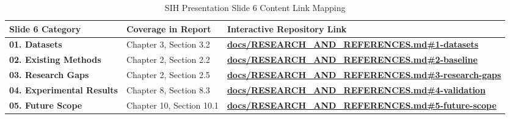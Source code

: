 \documentclass[11pt,a4paper,oneside]{report}
\begin{document}
\begin{table}[htbp]
\centering
\small
\caption{SIH Presentation Slide 6 Content Link Mapping}
\label{tab:sih_links}
\begin{tabularx}{\textwidth}{l p{4.5cm} X}
\toprule
\textbf{Slide 6 Category} & \textbf{Coverage in Report} & \textbf{Interactive Repository Link} \\
\midrule
\textbf{01. Datasets} & Chapter 3, Section 3.2 & \href{https://github.com/AstroNewz/Downscaling-of-weather-forecast-from-Block-level-to-Panchayat-level/blob/main/docs/RESEARCH_AND_REFERENCES.md\#1-datasets--data-sources}{\textbf{docs/RESEARCH\_AND\_REFERENCES.md\#1-datasets}} \\
\textbf{02. Existing Methods} & Chapter 2, Section 2.2 & \href{https://github.com/AstroNewz/Downscaling-of-weather-forecast-from-Block-level-to-Panchayat-level/blob/main/docs/RESEARCH_AND_REFERENCES.md\#2-baseline--existing-methods}{\textbf{docs/RESEARCH\_AND\_REFERENCES.md\#2-baseline}} \\
\textbf{03. Research Gaps} & Chapter 2, Section 2.5 & \href{https://github.com/AstroNewz/Downscaling-of-weather-forecast-from-Block-level-to-Panchayat-level/blob/main/docs/RESEARCH_AND_REFERENCES.md\#3-research-challenges--gaps}{\textbf{docs/RESEARCH\_AND\_REFERENCES.md\#3-research-gaps}} \\
\textbf{04. Experimental Results} & Chapter 8, Section 8.3 & \href{https://github.com/AstroNewz/Downscaling-of-weather-forecast-from-Block-level-to-Panchayat-level/blob/main/docs/RESEARCH_AND_REFERENCES.md\#4-experimental-results--validation}{\textbf{docs/RESEARCH\_AND\_REFERENCES.md\#4-validation}} \\
\textbf{05. Future Scope} & Chapter 10, Section 10.1 & \href{https://github.com/AstroNewz/Downscaling-of-weather-forecast-from-Block-level-to-Panchayat-level/blob/main/docs/RESEARCH_AND_REFERENCES.md\#5-future-scope--scalability}{\textbf{docs/RESEARCH\_AND\_REFERENCES.md\#5-future-scope}} \\
\bottomrule
\end{tabularx}
\end{table}
\end{document}
